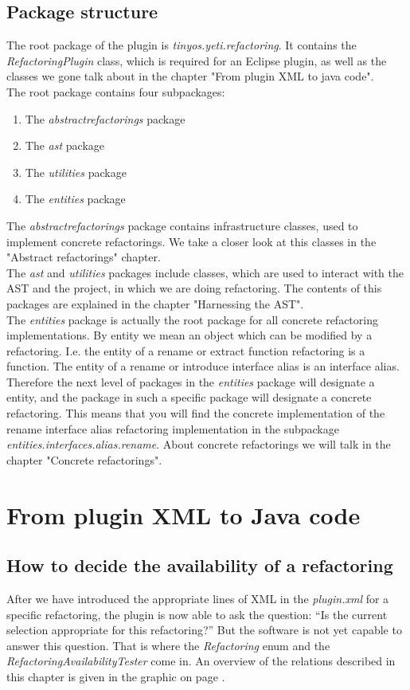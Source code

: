 \documentclass[a4paper,10pt]{report}
\begin{document}
\section{Package structure}
The root package of the plugin is {\it tinyos.yeti.refactoring}. It contains the {\it RefactoringPlugin} class, which is required for an Eclipse plugin, as well as the classes we gone talk about in the chapter "From plugin XML to java code".\\
The root package contains four subpackages:
   \begin{enumerate}
     \item The {\it abstractrefactorings} package
     \item The {\it ast} package
     \item The {\it utilities} package
     \item The {\it entities} package
   \end{enumerate}
The {\it abstractrefactorings} package contains infrastructure classes, used to implement concrete refactorings. We take a closer look at this classes in the "Abstract refactorings" chapter.\\
The {\it ast} and {\it utilities} packages include classes, which are used to interact with the AST and the project, in which we are doing refactoring. The contents of this packages are explained in the chapter "Harnessing the AST".\\
The {\it entities} package is actually the root package for all concrete refactoring implementations. By entity we mean an object which can be modified by a refactoring. I.e. the entity of a rename or extract function refactoring is a function. The entity of a rename or introduce interface alias is an interface alias.
Therefore the next level of packages in the {\it entities} package will designate a entity, and the package in such a specific package will designate a concrete refactoring. This means that you will find the concrete implementation of the rename interface alias refactoring implementation in the subpackage {\it entities.interfaces.alias.rename}.
About concrete refactorings we will talk in the chapter "Concrete refactorings".


\chapter{From plugin XML to Java code}
\label{fromPluginXMLToJavaCode}
\section{How to decide the availability of a refactoring}
After we have introduced the appropriate lines of XML in the {\it plugin.xml} for a specific refactoring, the plugin is now able to ask the question: ``Is the current selection appropriate for this refactoring?''
But the software is not yet capable to answer this question. That is where the {\it Refactoring} enum and the {\it RefactoringAvailabilityTester} come in. 
An overview of the relations described in this chapter is given in the graphic on page \pageref{AvailabilityTesterContext}.
\end{document}
